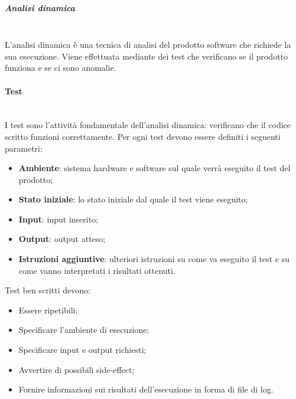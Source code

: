														
			\subparagraph{Analisi dinamica} \mbox{}\\
			L’analisi dinamica è una tecnica di analisi del prodotto software che richiede la sua esecuzione. Viene effettuata  mediante dei test che verificano se il prodotto funziona e se ci sono anomalie. 
			
		\paragraph{Test} \mbox{}\\	
		I test sono l'attività fondamentale dell'analisi dinamica: verificano che il codice scritto funzioni correttamente.
		Per ogni test devono  essere definiti i seguenti parametri:
		\begin{itemize}
			\item \textbf{Ambiente}: sistema hardware e software sul quale verrà eseguito il test del prodotto;
			\item \textbf{Stato iniziale}: lo stato iniziale dal quale il test viene eseguito;
			\item \textbf{Input}: input inserito;
			\item \textbf{Output}: output atteso;
			\item \textbf{Istruzioni aggiuntive}: ulteriori istruzioni su come va eseguito il test e su come vanno interpretati i risultati ottenuti.
		\end{itemize}
		Test ben scritti devono:
		\begin{itemize}
			\item Essere ripetibili;
			\item Specificare l'ambiente di esecuzione;
			\item Specificare input e output richiesti;
			\item Avvertire di possibili side-effect;
			\item Fornire informazioni sui risultati dell'esecuzione in forma di file di log.
		\end{itemize}	
			
